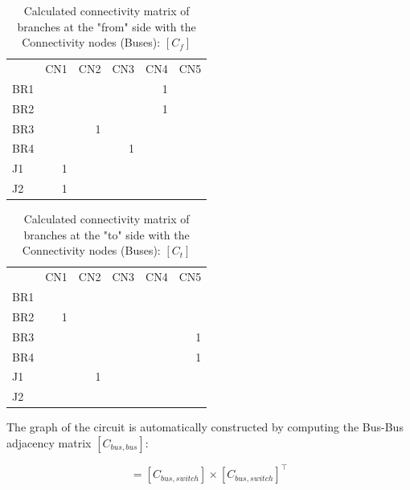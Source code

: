 \documentclass[nols,a4paper,twoside,symmetric,notoc,fleqn]{tufte-book}
\begin{document}
\begin{table}[h!]
	\begin{tabular}{lrrrrr}
		{} &  CN1 &  CN2 &  CN3 &  CN4 &  CN5 \\
		BR1 &      &      &      &    1 &      \\
		BR2 &      &      &      &    1 &      \\
		BR3 &      &    1 &      &      &      \\
		BR4 &      &      &    1 &      &      \\
		J1  &    1 &      &      &      &      \\
		J2  &    1 &      &      &      &      \\
	\end{tabular}
	\caption{Calculated connectivity matrix of branches at the "from" side with the Connectivity nodes (Buses): $[C_f]$}
\end{table}

\begin{table}[h!]
	\begin{tabular}{lrrrrr}
		{} &  CN1 &  CN2 &  CN3 &  CN4 &  CN5 \\
		BR1 &      &      &      &      &      \\
		BR2 &    1 &      &      &      &      \\
		BR3 &      &      &      &      &    1 \\
		BR4 &      &      &      &      &    1 \\
		J1  &      &    1 &      &      &      \\
		J2  &      &      &      &      &      \\
	\end{tabular}
	\caption{Calculated connectivity matrix of branches at the "to" side with the Connectivity nodes (Buses): $[C_t]$}
\end{table}

\vspace{0.5cm}

The graph of the circuit is automatically constructed by computing the Bus-Bus adjacency matrix  $[C_{bus, bus}]$:

\begin{equation}
	[C_{bus, bus}] = [C_{bus, switch}] \times [C_{bus, switch}]^\top
\end{equation}
\end{document}
